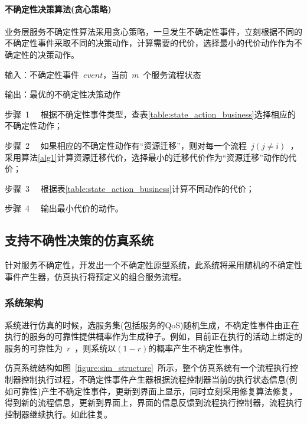 %
%
%
%


\paragraph{不确定性决策算法(贪心策略)}

业务层服务不确定性算法采用贪心策略，一旦发生不确定性事件，立刻根据不同的不确定性事件采取不同的决策动作，计算需要的代价，选择最小的代价动作作为不确定性的决策动作。

输入：不确定性事件~$event$，当前~$m$~个服务流程状态

输出：最优的不确定性决策动作

步骤~1~~ 根据不确定性事件类型，查表\ref{table:state_action_business}选择相应的不确定性动作；

步骤~2~~ 如果相应的不确定性动作有“资源迁移”，则对每一个流程~$j (j \neq i)$~，采用算法\ref{alg1}计算资源迁移代价，选择最小的迁移代价作为“资源迁移”动作的代价；

步骤~3~~ 根据表\ref{table:state_action_business}计算不同动作的代价；

步骤~4~~ 输出最小代价的动作。


\subsection{支持不确性决策的仿真系统}

针对服务不确定性，开发出一个不确定性原型系统，此系统将采用随机的不确定性事件产生器，仿真执行将预定义的组合服务流程。

\subsubsection{系统架构}

系统进行仿真的时候，选服务集(包括服务的QoS)随机生成，不确定性事件由正在执行的服务的可靠性提供概率作为生成种子。例如，目前正在执行的活动上绑定的服务的可靠性为~$r$~，则系统以$(1-r)$的概率产生不确定性事件。

仿真系统结构如图~\ref{figure:sim_structure}~所示，整个仿真系统有一个流程执行控制器控制执行过程，不确定性事件产生器根据流程控制器当前的执行状态信息(例如可靠性)产生不确定性事件，更新到界面上显示，同时立刻采用修复算法修复，得到新的流程信息，更新到界面上，界面的信息反馈到流程执行控制器，流程执行控制器继续执行。如此往复。

